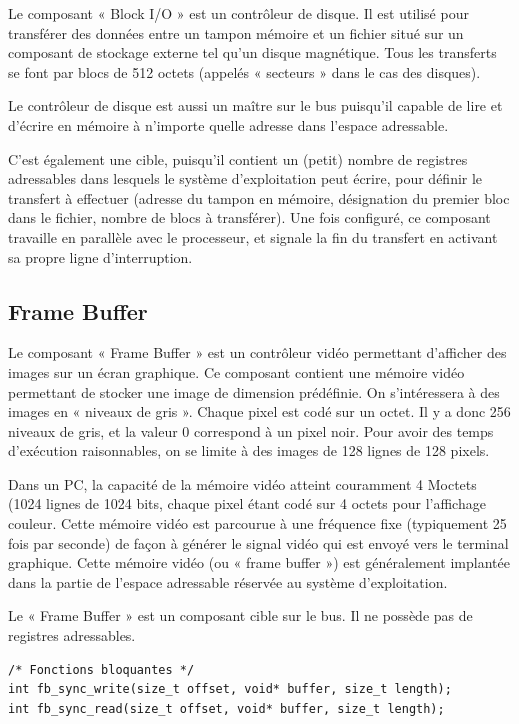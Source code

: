 \documentclass[11pt,english,french]{scrreprt}
\theoremstyle{remark}
\theoremstyle{definition}
\begin{document}
Le composant « Block I/O » est un contrôleur de disque. Il est utilisé pour transférer des données entre un tampon mémoire et un fichier situé sur un composant de stockage externe tel qu’un disque magnétique. Tous les transferts se font par blocs de 512 octets (appelés « secteurs » dans le cas des disques). 

Le contrôleur de disque est aussi un maître sur le bus puisqu’il capable de lire et d’écrire en mémoire à n’importe quelle adresse dans l’espace adressable. 

C’est également une cible, puisqu’il contient un (petit) nombre de registres adressables dans lesquels le système d’exploitation peut écrire, pour définir le transfert à effectuer (adresse du tampon en mémoire, désignation du premier bloc dans le fichier, nombre de blocs à transférer). Une fois configuré, ce composant travaille en parallèle avec le processeur, et signale la fin du transfert en activant sa propre ligne d’interruption.

\subsection{Frame Buffer} %

Le composant « Frame Buffer » est un contrôleur vidéo permettant d’afficher des images sur un écran graphique. Ce composant contient une mémoire vidéo permettant de stocker une image de dimension prédéfinie. On s’intéressera à des images en « niveaux de gris ». Chaque pixel est codé sur un octet. Il y a donc 256 niveaux de gris, et la valeur 0 correspond à un pixel noir. Pour avoir des temps d’exécution raisonnables, on se limite à des images de 128 lignes de 128 pixels. 

Dans un PC, la capacité de la mémoire vidéo atteint couramment 4 Moctets (1024 lignes de 1024 bits, chaque pixel étant codé sur 4 octets pour l’affichage couleur. Cette mémoire vidéo est parcourue à une fréquence fixe (typiquement 25 fois par seconde) de façon à générer le signal vidéo qui est envoyé vers le terminal graphique. Cette mémoire vidéo (ou « frame buffer ») est généralement implantée dans la partie de l’espace adressable réservée au système d’exploitation. 

Le « Frame Buffer » est un composant cible sur le bus. Il ne possède pas de registres adressables.

\begin{lstlisting}
/* Fonctions bloquantes */
int fb_sync_write(size_t offset, void* buffer, size_t length);
int fb_sync_read(size_t offset, void* buffer, size_t length);
\end{lstlisting}
\end{document}
